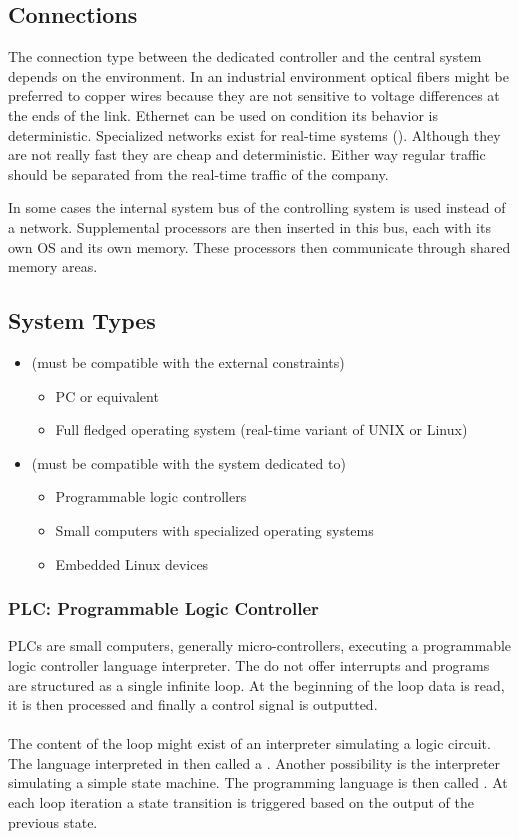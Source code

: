 \subsection{Connections}
The connection type between the dedicated controller and the central system depends on the environment.
In an industrial environment optical fibers might be preferred to copper wires because they are not sensitive to voltage differences at the ends of the link.
Ethernet can be used on condition its behavior is deterministic.
Specialized networks exist for real-time systems ().
Although they are not really fast they are cheap and deterministic. Either way regular traffic should be separated from the  real-time traffic of the company. 

In some cases the internal system bus of the controlling system is used instead of a network. Supplemental processors are then inserted in this bus, each with its own OS and its own memory. These processors then communicate through shared memory areas.

\subsection{System Types}
\begin{itemize}
	\item {} (must be compatible with the external constraints)
	\begin{itemize}
		\item PC or equivalent
		\item Full fledged operating system (real-time variant of UNIX or Linux)
	\end{itemize}
	\item {} (must be compatible with the system dedicated to)
	\begin{itemize}
		\item Programmable logic controllers
		\item Small computers with specialized operating systems
		\item Embedded Linux devices
	\end{itemize}
\end{itemize}

\subsubsection{PLC: Programmable Logic Controller}
PLCs are small computers, generally micro-controllers, executing a programmable logic controller language interpreter. The do not offer interrupts and programs are structured as a single infinite loop. At the beginning of the loop data is read, it is then processed and finally a control signal is outputted.
\\\\
The content of the loop might exist of an interpreter simulating a logic circuit. The language interpreted in then called a . Another possibility is the interpreter simulating a simple state machine. The programming language is then called . At each loop iteration a state transition is triggered based on the output of the previous state.

